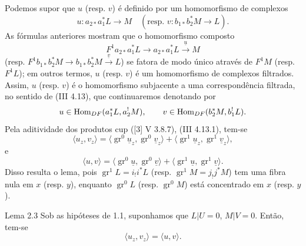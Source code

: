 Podemos supor que $u$ (resp. $v$) é definido por um homomorfismo de complexos
\[
u:a_{2*}a_1^*L\longrightarrow M
\quad
(\text{resp. }v:b_{1*}b_2^*M\longrightarrow L).
\]
As fórmulas anteriores mostram que o homomorfismo composto
\[
F^1a_{2*}a_1^*L\longrightarrow a_{2*}a_1^*L\xrightarrow{\underline u}M
\]
(resp. $F^1b_{1*}b_2^*M\to b_{1*}b_2^*M\xrightarrow{\underline v}L$) se fatora de modo único através de $F^1M$ (resp. $F^1L$); em outros termos, $u$ (resp. $v$) é um homomorfismo de complexos filtrados. Assim, $u$ (resp. $v$) é o homomorfismo subjacente a uma correspondência filtrada, no sentido de (III 4.13), que continuaremos denotando por
\[
u\in\operatorname{Hom}_{DF}(a_1^*L,a_2^!M),\qquad
v\in\operatorname{Hom}_{DF}(b_2^*M,b_1^!L).
\]
Pela aditividade dos produtos cup ([3] V 3.8.7), (III 4.13.1), tem-se
\[
\langle u_z,v_z\rangle
 =\langle \operatorname{gr}^0\underline u_z,\operatorname{gr}^0\underline v_z\rangle
 +\langle \operatorname{gr}^1\underline u_z,\operatorname{gr}^1\underline v_z\rangle,
\]
e
\[
\langle u,v\rangle
 =\langle \operatorname{gr}^0\underline u,\operatorname{gr}^0\underline v\rangle
 +\langle \operatorname{gr}^1\underline u,\operatorname{gr}^1\underline v\rangle.
\]
Disso resulta o lema, pois $\operatorname{gr}^1L=i_!i^*L$ (resp. $\operatorname{gr}^1M=j_!j^*M$) tem uma fibra nula em $x$ (resp. $y$), enquanto $\operatorname{gr}^0L$ (resp. $\operatorname{gr}^0M$) está concentrado em $x$ (resp. $y$).

\begin{statement}{Lema 2.3}
Sob as hipóteses de 1.1, suponhamos que $L|U=0$, $M|V=0$. Então, tem-se
\[
\langle u_z,v_z\rangle=\langle u,v\rangle .
\]
\end{statement}
